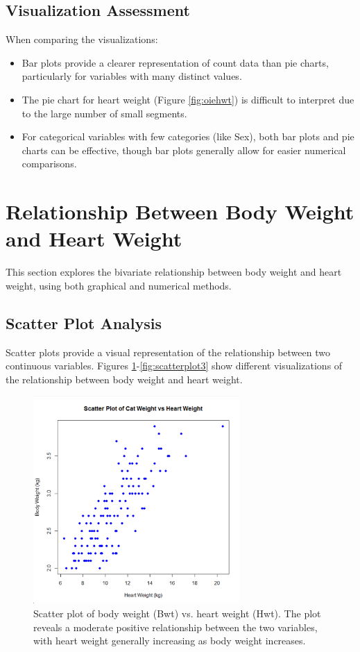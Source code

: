 \documentclass[a4paper,12pt]{article}
\begin{document}
\subsection{Visualization Assessment}
\label{subsec:vis_assessment}

When comparing the visualizations:
\begin{itemize}[leftmargin=1.5cm]
    \item Bar plots provide a clearer representation of count data than pie charts, particularly for variables with many distinct values.
    \item The pie chart for heart weight (Figure \ref{fig:oiehwt}) is difficult to interpret due to the large number of small segments.
    \item For categorical variables with few categories (like Sex), both bar plots and pie charts can be effective, though bar plots generally allow for easier numerical comparisons.
\end{itemize}

\section{Relationship Between Body Weight and Heart Weight}
\label{sec:relationship}

This section explores the bivariate relationship between body weight and heart weight, using both graphical and numerical methods.

\subsection{Scatter Plot Analysis}
\label{subsec:scatter}

Scatter plots provide a visual representation of the relationship between two continuous variables. Figures \ref{fig:scatterplot}-\ref{fig:scatterplot3} show different visualizations of the relationship between body weight and heart weight.

\begin{figure}[H]
    \centering
    \includegraphics[width=0.7\textwidth]{scatterplot.png}
    \caption{Scatter plot of body weight (Bwt) vs. heart weight (Hwt). The plot reveals a moderate positive relationship between the two variables, with heart weight generally increasing as body weight increases.}
    \label{fig:scatterplot}
\end{figure}
\end{document}
